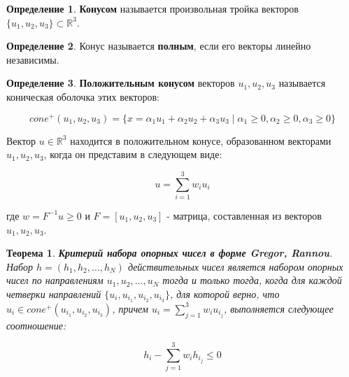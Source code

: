 \documentclass[a4paper, 12pt, titlepage]{article}
\theoremstyle{definition}
\newtheorem{SmartDefinition}{Определение}
\theoremstyle{plain}
\newtheorem{SmartTheorem}{Теорема}
\theoremstyle{plain}
\begin{document}
\begin{SmartDefinition}
 \label{def:cone}
 \textbf{Конусом} называется произвольная тройка векторов
 $\{u_{1}, u_{2}, u_{3}\} \subset \mathbb{R}^{3}$.
\end{SmartDefinition}

\begin{SmartDefinition}
 \label{def:full-cone}
 Конус называется \textbf{полным}, если его векторы линейно независимы.
\end{SmartDefinition}

\begin{SmartDefinition}
 \label{def:full-positive-cone}
 \textbf{Положительным конусом} векторов $u_{1}, u_{2}, u_{3}$ называется
 коническая оболочка этих векторов:

 \begin{equation}
  cone^{+}(u_{1}, u_{2}, u_{3}) =
  \{x = \alpha_{1} u_{1} + \alpha_{2} u_{2} + \alpha_{3} u_{3}
  \; | \; \alpha_{1} \geq 0, \alpha_{2} \geq 0, \alpha_{3} \geq 0\}
 \end{equation}
\end{SmartDefinition}

Вектор $u \in \mathbb{R}^{3}$ находится в положительном конусе, образованном 
векторами $u_{1}, u_{2}, u_{3}$, когда он представим в следующем виде:

\begin{equation}
 u = \sum \limits_{i = 1}^{3} w_{i} u_{i}
\end{equation}

где $w = F^{-1} u \geq 0$ и $F = [u_{1}, u_{2}, u_{3}]$ - матрица, составленная 
из векторов $u_{1}, u_{2}, u_{3}$.

\begin{SmartTheorem}
 \label{thm:criterion-gregor-rannou}
 \textbf{Критерий набора опорных чисел в форме Gregor, Rannou}.
 Набор $h = (h_{1}, h_{2}, \ldots, h_{N})$ действительных чисел является набором
 опорных чисел по направлениям $u_{1}, u_{2}, \ldots, u_{N}$ тогда и только
 тогда, когда для каждой четверки направлений
 $\{u_{i}, u_{i_{1}}, u_{i_{2}}, u_{i_{3}}\}$,
 для которой верно, что $u_{i} \in cone^{+}(u_{i_{1}}, u_{i_{2}}, u_{i_{3}})$,
 причем $u_{i} = \sum \limits_{j = 1}^{3} w_{i} u_{i_{j}}$, выполняется
 следующее соотношение:

 \begin{equation}
  \label{thm:criterion-gregor-rannou:condition}
  h_{i} - \sum \limits_{j = 1}^{3} w_{i} h_{i_{j}} \leq 0
 \end{equation}
\end{SmartTheorem}
\end{document}

